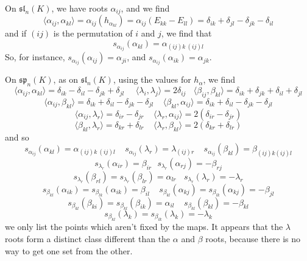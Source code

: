 \begin{example}
    On $\mathfrak{sl}_n(K)$, we have roots $\alpha_{ij}$, and we find
    \[ \langle \alpha_{ij}, \alpha_{kl} \rangle = \alpha_{ij}(h_{\alpha_{kl}}) = \alpha_{ij}(E_{kk} - E_{ll}) = \delta_{ik} + \delta_{jl} - \delta_{jk} - \delta_{il} \]
    and if $(ij)$ is the permutation of $i$ and $j$, we find that
    \[ s_{\alpha_{ij}}(\alpha_{kl}) = \alpha_{(ij)k\ (ij)l} \]
    So, for instance, $s_{\alpha_{ij}}(\alpha_{ij}) = \alpha_{ji}$, and $s_{\alpha_{ij}}(\alpha_{ik}) = \alpha_{jk}$.
\end{example}

\begin{example}
    On $\mathfrak{sp}_n(K)$, as on $\mathfrak{sl}_n(K)$, using the values for $h_\alpha$, we find
    \[ \langle \alpha_{ij}, \alpha_{kl} \rangle = \delta_{ik} - \delta_{il} - \delta_{jk} + \delta_{jl}\ \ \ \ \ \ \langle \lambda_i, \lambda_j \rangle = 2 \delta_{ij} \ \ \ \ \langle \beta_{ij}, \beta_{kl} \rangle = \delta_{ik} + \delta_{jk} + \delta_{il} + \delta_{jl} \]
    \[ \langle \alpha_{ij}, \beta_{kl} \rangle = \delta_{ik} + \delta_{il} - \delta_{jk} - \delta_{jl}\ \ \ \ \ \langle \beta_{kl}, \alpha_{ij} \rangle = \delta_{ik} + \delta_{il} - \delta_{jk} - \delta_{jl} \]
    \[ \langle \alpha_{ij}, \lambda_r \rangle = \delta_{ir} - \delta_{jr}\ \ \ \ \ \langle \lambda_r, \alpha_{ij} \rangle = 2(\delta_{ir} - \delta_{jr}) \]
    \[ \langle \beta_{kl}, \lambda_r \rangle = \delta_{kr} + \delta_{lr}\ \ \ \ \ \langle \lambda_r, \beta_{kl} \rangle = 2(\delta_{kr} + \delta_{lr}) \]
    and so
    \[ s_{\alpha_{ij}}(\alpha_{kl}) = \alpha_{(ij)k\ (ij)l}\ \ \ \ \ s_{\alpha_{ij}}(\lambda_r) = \lambda_{(ij) r}\ \ \ \ \ s_{\alpha_{ij}}(\beta_{kl}) = \beta_{(ij)k (ij)l} \]
    \[ s_{\lambda_r}(\alpha_{ir}) = \beta_{ir}\ \ \ s_{\lambda_r}(\alpha_{rj}) = -\beta_{rj} \]
    \[ s_{\lambda_r}(\beta_{rl}) = s_{\lambda_r}(\beta_{lr}) = \alpha_{lr}\ \ \ \ s_{\lambda_r}(\lambda_r) = -\lambda_r \]
    \[ s_{\beta_{kl}}(\alpha_{ik}) = s_{\beta_{lk}}(\alpha_{ik}) = \beta_{il}\ \ \ \ \ s_{\beta_{kl}}(\alpha_{kj}) = s_{\beta_{lk}}(\alpha_{kj}) = -\beta_{jl} \]
    \[ s_{\beta_{kl}}(\beta_{ki}) = s_{\beta_{kl}}(\beta_{ik}) = \alpha_{il}\ \ \ \ \ s_{\beta_{kl}}(\beta_{kl}) = -\beta_{kl} \]
    \[ s_{\beta_{kl}}(\lambda_k) = s_{\beta_{lk}}(\lambda_k) = -\lambda_k \]
    we only list the points which aren't fixed by the maps. It appears that the $\lambda$ roots form a distinct class different than the $\alpha$ and $\beta$ roots, because there is no way to get one set from the other.
\end{example}

